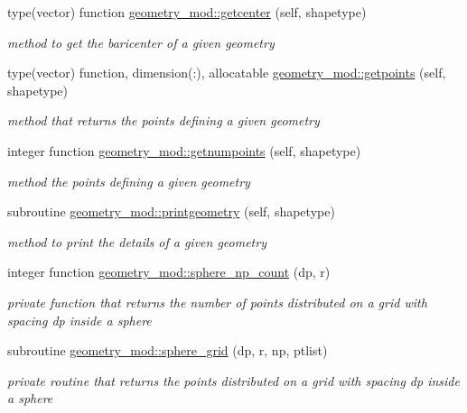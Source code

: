 \begin{DoxyCompactItemize}
type(vector) function \mbox{\hyperlink{namespacegeometry__mod_a4a38edbff02aa0ff5f16a16c39bf778e}{geometry\+\_\+mod\+::getcenter}} (self, shapetype)
\begin{DoxyCompactList}\small\item\em method to get the baricenter of a given geometry \end{DoxyCompactList}\item 
type(vector) function, dimension(\+:), allocatable \mbox{\hyperlink{namespacegeometry__mod_a0b1a3c5aa414292ace34d59487082e3a}{geometry\+\_\+mod\+::getpoints}} (self, shapetype)
\begin{DoxyCompactList}\small\item\em method that returns the points defining a given geometry \end{DoxyCompactList}\item 
integer function \mbox{\hyperlink{namespacegeometry__mod_a524c5d28a80fb6729b102126485605ce}{geometry\+\_\+mod\+::getnumpoints}} (self, shapetype)
\begin{DoxyCompactList}\small\item\em method the points defining a given geometry \end{DoxyCompactList}\item 
subroutine \mbox{\hyperlink{namespacegeometry__mod_aed4426181ca851b41717edd50268e5f3}{geometry\+\_\+mod\+::printgeometry}} (self, shapetype)
\begin{DoxyCompactList}\small\item\em method to print the details of a given geometry \end{DoxyCompactList}\item 
integer function \mbox{\hyperlink{namespacegeometry__mod_a05de7940b4e7df5a2b31f3d0414e3743}{geometry\+\_\+mod\+::sphere\+\_\+np\+\_\+count}} (dp, r)
\begin{DoxyCompactList}\small\item\em private function that returns the number of points distributed on a grid with spacing dp inside a sphere \end{DoxyCompactList}\item 
subroutine \mbox{\hyperlink{namespacegeometry__mod_a6c03a4ea3de6763940396dbeb3908ebc}{geometry\+\_\+mod\+::sphere\+\_\+grid}} (dp, r, np, ptlist)
\begin{DoxyCompactList}\small\item\em private routine that returns the points distributed on a grid with spacing dp inside a sphere \end{DoxyCompactList}\item 

\end{DoxyCompactItemize}
